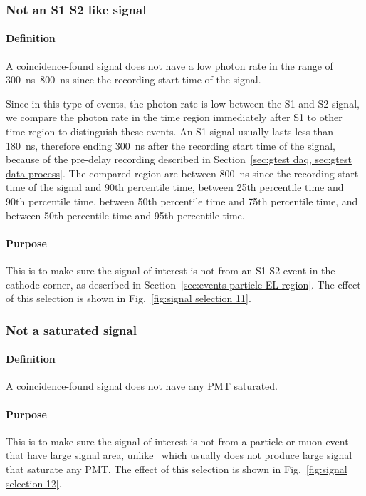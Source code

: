 \subsubsection{Not an S1 S2 like signal}
\paragraph{Definition}
A coincidence-found signal does not have a low photon rate in the range of \SIrange{300}{800}{\ns} since the recording start time of the signal. 

Since in this type of events, the photon rate is low between the S1 and S2 signal, we compare the photon rate in the time region immediately after S1 to other time region to distinguish these events. An S1 signal usually lasts less than \SI{180}{\ns}, therefore ending \SI{300}{\ns} after the recording start time of the signal, because of the pre-delay recording described in Section~\ref{sec:gtest daq, sec:gtest data process}. The compared region are between \SI{800}{\ns} since the recording start time of the signal and 90th percentile time, between 25th percentile time and 90th percentile time, between 50th percentile time and 75th percentile time, and between 50th percentile time and 95th percentile time.

\paragraph{Purpose}
This is to make sure the signal of interest is not from an S1 S2 event in the cathode corner, as described in Section~\ref{sec:events particle EL region}. The effect of this selection is shown in Fig.~\ref{fig:signal selection 11}.

\subsubsection{Not a saturated signal}
\paragraph{Definition}
A coincidence-found signal does not have any PMT saturated.
\paragraph{Purpose}
This is to make sure the signal of interest is not from a particle or muon event that have large signal area, unlike \ees\ which usually does not produce large signal that saturate any PMT. The effect of this selection is shown in Fig.~\ref{fig:signal selection 12}.

